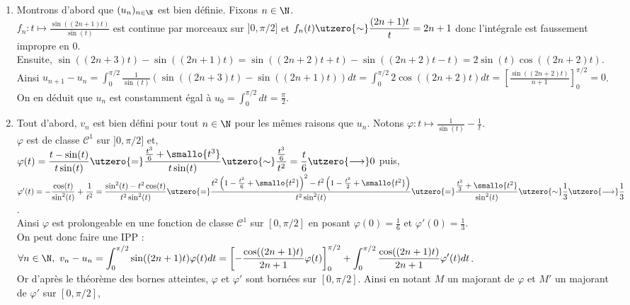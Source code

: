 \documentclass{book}
\begin{document}
	\begin{enumerate}[leftmargin=*]
		\item Montrons d'abord que $(u_n)_{n\in \N}$ est bien définie. Fixons $n\in \N$.\\
		$f_n:t\mapsto \displaystyle\frac{\sin((2n+1)t)}{\sin(t)}$ est continue par morceaux sur $]0,\pi/2]$ et $f_n(t)\utzero{\sim}\displaystyle\frac{(2n+1)t}{t}=2n+1$ donc l'intégrale est faussement impropre en $0$.\\
		Ensuite, $\sin((2n+3)t)-\sin((2n+1)t)=\sin((2n+2)t+t)-\sin((2n+2)t-t)=2\sin(t)\cos((2n+2)t)$.\\
		Ainsi $u_{n+1}-u_n=\displaystyle\int_0^{\pi/2}\frac{1}{\sin(t)}(\sin((2n+3)t)-\sin((2n+1)t))dt=\int_0^{\pi/2}2\cos((2n+2)t)dt=\left[\frac{\sin((2n+2)t)}{n+1}\right]_0^{\pi/2}=0$.
		On en déduit que $u_n$ est constamment égal à $u_0=\displaystyle\int_0^{\pi/2}dt=\frac{\pi}{2}$.
		\item Tout d'abord, $v_n$ est bien défini pour tout $n\in \N$ pour les mêmes raisons que $u_n$.
		Notons $\varphi:t\mapsto \displaystyle\frac{1}{\sin(t)}-\frac{1}{t}$.\\
		$\varphi$ est de classe $\mathcal C^1$ sur $]0,\pi/2]$ et,\\
		$\varphi(t)=\displaystyle\frac{t-\sin(t)}{t\sin(t)}\utzero{=}\frac{\frac{t^3}{6}+\smallo{t^3}}{t\sin(t)}\utzero{\sim}\frac{\frac{t^3}{6}}{t^2}=\frac{t}{6}\utzero{\longrightarrow}0$ puis,\\
		$\varphi'(t)=\displaystyle-\frac{\cos(t)}{\sin^2(t)}+\frac{1}{t^2}=\frac{\sin^2(t)-t^2\cos(t)}{t^2\sin^2(t)}\utzero{=}\frac{t^2\left(1-\frac{t^2}{6}+\smallo{t^2}\right)^2-t^2\left(1-\frac{t^2}{2}+\smallo{t^2}\right)}{t^2\sin^2(t)}\utzero{=}\frac{\frac{t^2}{3}+\smallo{t^2}}{\sin^2(t)}\utzero{\sim}\frac{1}{3}\utzero{\longrightarrow}\frac{1}{3}$.\\
		Ainsi $\varphi$ est prolongeable en une fonction de classe $\mathcal C^1$ sur $[0,\pi/2]$ en posant $\varphi(0)=\displaystyle\frac{1}{6}$ et $\varphi'(0)=\displaystyle\frac{1}{3}$.\\
		On peut donc faire une IPP :\\
		$\forall n\in \N,\ v_n-u_n=\displaystyle\int_0^{\pi/2}\sin((2n+1)t)\varphi(t)dt=\left[-\frac{\cos((2n+1)t)}{2n+1}\varphi(t)\right]_0^{\pi/2}+\int_0^{\pi/2}\frac{\cos((2n+1)t)}{2n+1}\varphi'(t)dt$.\\
		Or d'après le théorème des bornes atteintes, $\varphi$ et $\varphi'$ sont bornées sur $[0,\pi/2]$. Ainsi en notant $M$ un majorant de $\varphi$ et $M'$ un majorant de $\varphi'$ sur $[0,\pi/2]$,\\

\end{enumerate}
\end{document}
